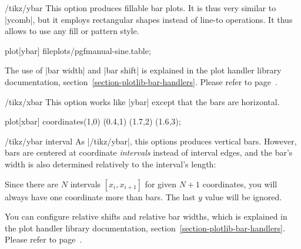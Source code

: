 \begin{key}{/tikz/ybar}
    This option produces fillable bar plots. It is thus very similar to
    |ycomb|, but it employs rectangular shapes instead of line-to operations.
    It thus allows to use any fill or pattern style.
\begin{codeexample}[]
\tikz\draw[draw=blue,fill=blue!60!black] plot[ybar] file{plots/pgfmanual-sine.table};
\end{codeexample}

\begin{codeexample}[]
\end{codeexample}
    The use of |bar width| and |bar shift| is explained in the plot handler
    library documentation, section~\ref{section-plotlib-bar-handlers}. Please
    refer to page~\pageref{key-bar-width}.
\end{key}

\begin{key}{/tikz/xbar}
    This option works like |ybar| except that the bars are horizontal.
\begin{codeexample}[preamble={\usetikzlibrary{patterns}}]
\tikz \draw[pattern=north west lines] plot[xbar]
   coordinates{(1,0) (0.4,1) (1.7,2) (1.6,3)};
\end{codeexample}
\end{key}

\begin{key}{/tikz/ybar interval}
    As |/tikz/ybar|, this options produces vertical bars. However, bars are
    centered at coordinate \emph{intervals} instead of interval edges, and the
    bar's width is also determined relatively to the interval's length:
\begin{codeexample}[]
\end{codeexample}
    Since there are $N$ intervals $[x_i,x_{i+1}]$ for given $N+1$ coordinates,
    you will always have one coordinate more than bars. The last $y$ value will
    be ignored.

    You can configure relative shifts and relative bar widths, which is
    explained in the plot handler library documentation,
    section~\ref{section-plotlib-bar-handlers}. Please refer to
    page~\pageref{key-bar-interval-width}.
\end{key}

